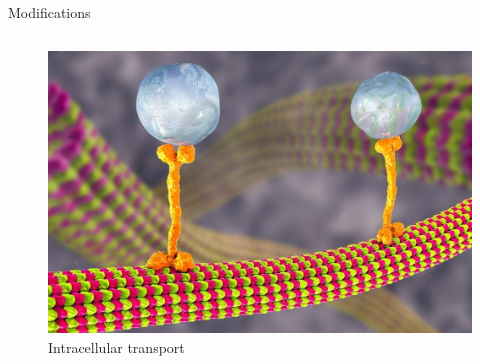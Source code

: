 \documentclass[10pt,xcolor=table, aspectratio=1610]{beamer}
\begin{document}
\begin{frame}{Modifications}
\begin{columns}
{\begin{figure}
        \includegraphics[width=\textwidth]{img/kinesin.jpeg}
        \caption*{Intracellular transport}
      \end{figure}
      }
    \end{columns}
\end{frame}
\end{document}
